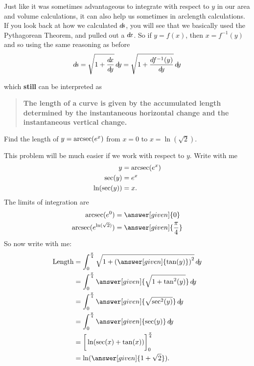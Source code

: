 \documentclass{ximera}
\begin{document}
Just like it was sometimes advantageous to integrate with respect to
$y$ in our area and volume calculations, it can also help us sometimes
in arclength calculations.  If you look back at how we calculated $\mathop{}\!d\!
s$, you will see that we basically used the Pythagorean Theorem, and
pulled out a $\mathop{}\!d\! x$.  So if $y = f(x)$, then $x = f^{-1}(y)$ and so
using the same reasoning as before
\[
\d s = \sqrt{1+\frac{\d x}{\d y}} \d y  = \sqrt{1+\dd[f^{-1}(y)]{y}} \d y
\]
\begin{image}
\end{image}
which \textbf{still} can be interpreted as
\begin{quote}
  \textbf{The length of a curve is given by the
    \textcolor{green!70!black!70!blue}{accumulated}
    \textcolor{purple!50!blue!90!black}{length determined by the
      instantaneous horizontal change and the instantaneous vertical
      change}.}
\end{quote}
\begin{example}
  Find the length of $y = \operatorname{arcsec}(e^x)$ from $x= 0$ to
  $x=\ln(\sqrt{2})$.
  \begin{explanation}
    This problem will be much easier if we work with respect to $y$. Write with me
    \begin{align*}
      y &= \operatorname{arcsec}(e^x)\\
      \sec(y) &= e^x\\
      \ln(\sec(y)) &= x.
    \end{align*}
    The limits of integration are
    \begin{align*}
      \arcsec(e^0) &= \answer[given]{0}\\
      \arcsec(e^{\ln(\sqrt{2})}) &= \answer[given]{\frac{\pi}{4}}
    \end{align*}
    So now write with me:
    \begin{align*}
      \text{Length} &= \int_0^{\frac{\pi}{4}} \sqrt{1+\left( \answer[given]{\tan(y)} \right)^2} \d y\\
      &=\int_0^{\frac{\pi}{4}} \answer[given]{\sqrt{1+\tan^2(y)}}\d y\\
      &=\int_0^{\frac{\pi}{4}} \answer[given]{\sqrt{\sec^2(y)}}\d y\\
      &=\int_0^{\frac{\pi}{4}} \answer[given]{\sec(y)} \d y\\
      &=\eval{\ln(\sec(x)+\tan(x))}_0^\frac{\pi}{4}\\
      &=\ln(\answer[given]{1+\sqrt{2}}).
    \end{align*}
  \end{explanation}
\end{example}
\end{document}
